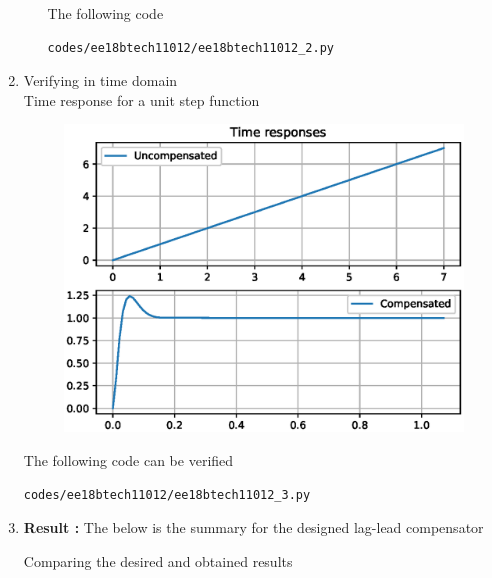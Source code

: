 \begin{enumerate}[label=\thesubsection.\arabic*.,ref=\thesubsection.\theenumi]
\begin{itemize}
The following code 
\begin{lstlisting}
codes/ee18btech11012/ee18btech11012_2.py
\end{lstlisting}
\end{itemize}


\item Verifying in time domain 
\\
\solution 
Time response for a unit step function
\begin{figure}[!h]
\centering
  \includegraphics[width=\columnwidth]{./figs/ee18btech11012/ee18btech11012_3.eps}
\caption{}
\label{fig:2} 
\end{figure}


The following code can be verified
\begin{lstlisting}
codes/ee18btech11012/ee18btech11012_3.py
\end{lstlisting}
\item
\textbf{Result :}
The below is the summary for the designed lag-lead compensator
\begin{table}[!ht]
\centering

\caption{Comparing the desired and obtained results}
\label{table:ee18btech11012_table1}
\end{table}

\end{enumerate}
